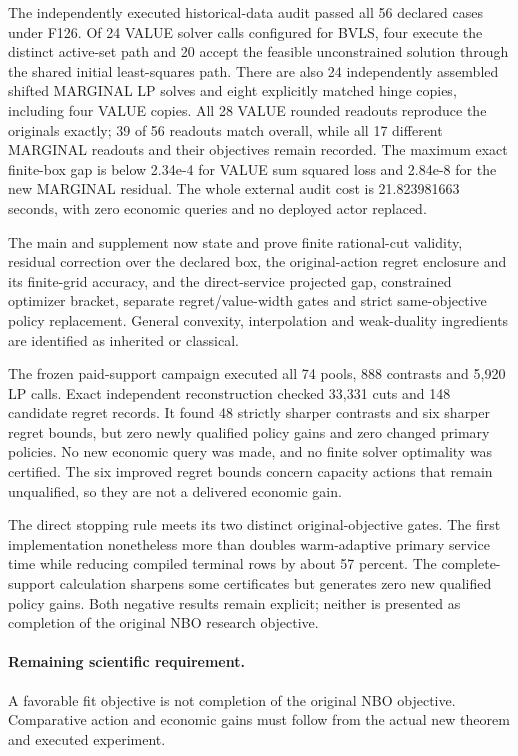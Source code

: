 The independently executed historical-data audit passed all 56 declared cases under F126. Of 24 VALUE solver calls configured for BVLS, four execute the distinct active-set path and 20 accept the feasible unconstrained solution through the shared initial least-squares path. There are also 24 independently assembled shifted MARGINAL LP solves and eight explicitly matched hinge copies, including four VALUE copies. All 28 VALUE rounded readouts reproduce the originals exactly; 39 of 56 readouts match overall, while all 17 different MARGINAL readouts and their objectives remain recorded. The maximum exact finite-box gap is below 2.34e-4 for VALUE sum squared loss and 2.84e-8 for the new MARGINAL residual. The whole external audit cost is 21.823981663 seconds, with zero economic queries and no deployed actor replaced.\par
The main and supplement now state and prove finite rational-cut validity, residual correction over the declared box, the original-action regret enclosure and its finite-grid accuracy, and the direct-service projected gap, constrained optimizer bracket, separate regret/value-width gates and strict same-objective policy replacement. General convexity, interpolation and weak-duality ingredients are identified as inherited or classical.\par
The frozen paid-support campaign executed all 74 pools, 888 contrasts and 5,920 LP calls. Exact independent reconstruction checked 33,331 cuts and 148 candidate regret records. It found 48 strictly sharper contrasts and six sharper regret bounds, but zero newly qualified policy gains and zero changed primary policies. No new economic query was made, and no finite solver optimality was certified. The six improved regret bounds concern capacity actions that remain unqualified, so they are not a delivered economic gain.\par
The direct stopping rule meets its two distinct original-objective gates. The first implementation nonetheless more than doubles warm-adaptive primary service time while reducing compiled terminal rows by about 57 percent. The complete-support calculation sharpens some certificates but generates zero new qualified policy gains. Both negative results remain explicit; neither is presented as completion of the original NBO research objective.\par

\paragraph{Remaining scientific requirement.} A favorable fit objective is not completion of the original NBO objective. Comparative action and economic gains must follow from the actual new theorem and executed experiment.

